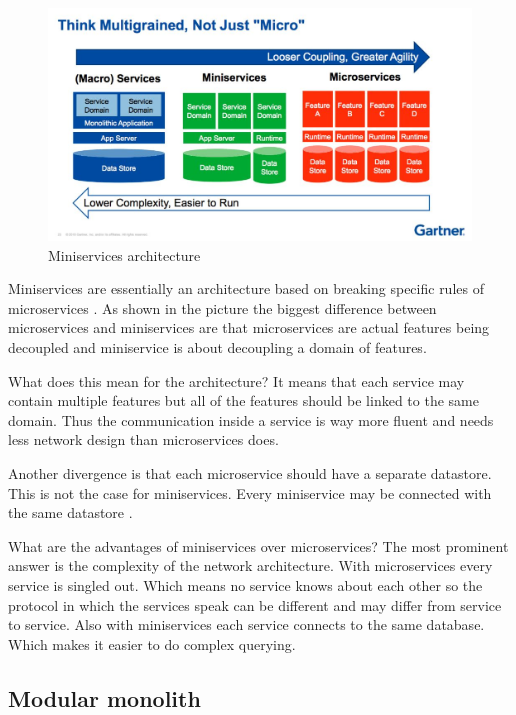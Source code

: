 \begin{figure}[H]
	\includegraphics[width=\linewidth]{miniservices.png}
	\caption{Miniservices architecture \cite{miniservicesDefinition}}
\end{figure}

Miniservices are essentially an architecture based on breaking specific rules of microservices \cite{miniservicesOrigin}. As shown in the picture the biggest difference between microservices and miniservices are that microservices are actual features being decoupled and miniservice is about decoupling a domain of features.

What does this mean for the architecture? It means that each service may contain multiple features but all of the features should be linked to the same domain. Thus the communication inside a service is way more fluent and needs less network design than microservices does.

Another divergence is that each microservice should have a separate datastore. This is not the case for miniservices. Every miniservice may be connected with the same datastore \cite{miniservicesDefinition}.

What are the advantages of miniservices over microservices? The most prominent answer is the complexity of the network architecture. With microservices every service is singled out. Which means no service knows about each other so the protocol in which the services speak can be different and may differ from service to service. Also with miniservices each service connects to the same database. Which makes it easier to do complex querying.

\subsection{Modular monolith}
\label{sec:ModularMonolith}

